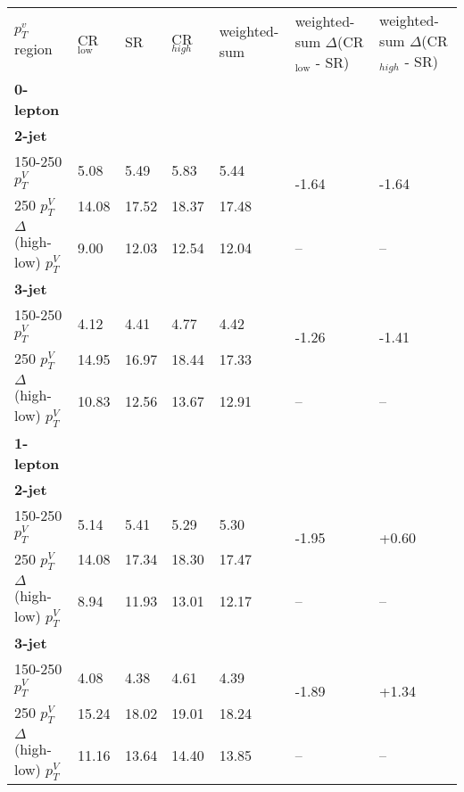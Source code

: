 \begin{table}[!htb]
  \centering
  \begin{tabular}{lllllll}
    \toprule
    $p_T^v$ region & CR$_{\text{low}}$ &  SR   &  CR$_{high}$ & weighted-sum &  weighted-sum $\Delta$(CR$_{\text{low}}$ - SR)  & weighted-sum $\Delta$(CR$_{high}$ - SR)    \\
    {\bfseries 0-lepton}& & & & & & \\
    {\bfseries 2-jet} & & & & & & \\
    150-250 $p_T^V$ & 5.08       & 5.49    & 5.83         & 5.44    &   \multirow{2}{*}{-1.64}       &      \multirow{2}{*}{-1.64}     \\
    250 $p_T^V$                  & 14.08      & 17.52  & 18.37        & 17.48    &         &           \\
    $\Delta$(high-low) $p_T^V$   & 9.00       & 12.03  & 12.54        & 12.04    &    --      &     -- \\
    {\bfseries 3-jet} & & & & & & \\
    150-250 $p_T^V$              & 4.12       & 4.41    & 4.77         & 4.42     &   \multirow{2}{*}{-1.26}       &   \multirow{2}{*}{-1.41}         \\
    250 $p_T^V$                  & 14.95      & 16.97   & 18.44        & 17.33    &          &            \\
    $\Delta$(high-low) $p_T^V$   & 10.83      & 12.56   & 13.67        & 12.91    &    --      &  --     \\
    {\bfseries 1-lepton} & & & & & & \\
    {\bfseries 2-jet} & & & & & &  \\
    150-250 $p_T^V$              & 5.14  & 5.41  & 5.29  & 5.30  &   \multirow{2}{*}{-1.95}            &  \multirow{2}{*}{+0.60}    \\
    250 $p_T^V$                  & 14.08 & 17.34 & 18.30 & 17.47 &               &         \\
    $\Delta$(high-low) $p_T^V$   & 8.94  & 11.93 & 13.01 & 12.17 &      --         &   --  \\
    {\bfseries 3-jet} & & & & & & \\
    150-250 $p_T^V$              & 4.08  & 4.38  & 4.61  & 4.39  &    \multirow{2}{*}{-1.89}     &     \multirow{2}{*}{+1.34}      \\ 
    250 $p_T^V$                  & 15.24 & 18.02 & 19.01 & 18.24 &               &              \\
    $\Delta$(high-low) $p_T^V$   & 11.16 & 13.64 & 14.40 & 13.85 &     --          &      --  \\

\end{tabular}
\end{table}
